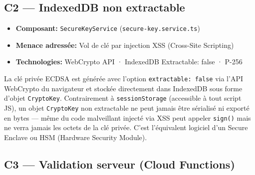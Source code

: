 \documentclass[12pt,a4paper]{report}
\begin{document}
\vspace{0.3cm}

\subsection{C2 — IndexedDB non extractable}

\begin{tcolorbox}[definbox,title={Couche C2 --- IndexedDB non extractable}]
  \begin{itemize}[itemsep=5pt]
    \item \textbf{Composant:} \texttt{SecureKeyService} (\texttt{secure-key.service.ts})
    \item \textbf{Menace adressée:} Vol de clé par injection XSS (Cross-Site Scripting)
    \item \textbf{Technologies:} WebCrypto API · IndexedDB Extractable: false · P-256
  \end{itemize}
  \vspace{0.3cm}
  La clé privée ECDSA est générée avec l'option \texttt{extractable: false} via l'API
  WebCrypto du navigateur et stockée directement dans IndexedDB sous forme d'objet
  \texttt{CryptoKey}. Contrairement à \texttt{sessionStorage} (accessible à tout script JS),
  un objet \texttt{CryptoKey} non extractable ne peut jamais être sérialisé ni exporté en
  bytes --- même du code malveillant injecté via XSS peut appeler \texttt{sign()} mais ne
  verra jamais les octets de la clé privée. C'est l'équivalent logiciel d'un Secure Enclave
  ou HSM (Hardware Security Module).
\end{tcolorbox}

\vspace{0.3cm}

\subsection{C3 — Validation serveur (Cloud Functions)}
\end{document}
